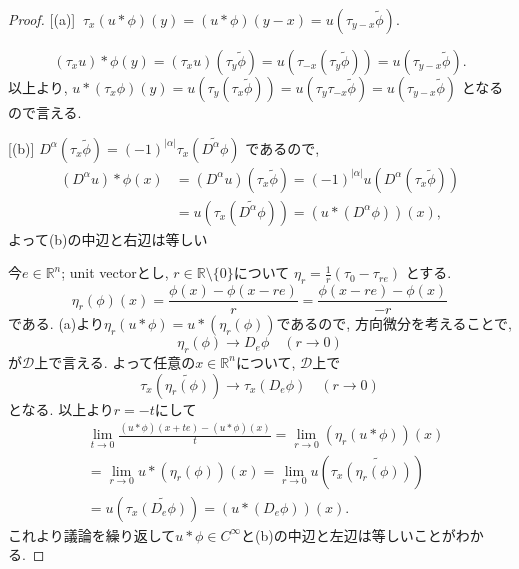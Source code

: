 \documentclass[dvipdfmx,a4paper,11pt]{article} %
\theoremstyle{definition}
\theoremstyle{remark}
\numberwithin{equation}{section}
\begin{document}
\begin{proof}

[(a)] \(\ \tau_x(u \ast \phi)(y) = (u \ast \phi)(y-x) = u(\tau_{y-x} \widetilde{\phi})\).

\[
(\tau_x u) \ast \phi (y) = (\tau_x u)(\tau_y \widetilde{\phi}) = u(\tau_{-x}(\tau_y \widetilde{\phi})) 
= u(\tau_{y-x} \widetilde{\phi}).
\]
以上より, \(u \ast (\tau_x \phi)(y) = u(\tau_y (\tau_x \widetilde{\phi})) = u(\tau_y \tau_{-x} \widetilde{\phi}) = u(\tau_{y-x} \widetilde{\phi})\)  となるので言える. 

[(b)]
\(D^\alpha (\tau_x \widetilde{\phi}) = (-1)^{|\alpha|} \tau_x (\widetilde{D^\alpha \phi})\) 
であるので, 
\begin{align*}
(D^\alpha u) \ast \phi (x) 
&= (D^\alpha u)(\tau_x \widetilde{\phi}) 
= (-1)^{|\alpha|} u(D^\alpha (\tau_x \widetilde{\phi})) \\
&= u(\tau_x (\widetilde{D^\alpha \phi})) = (u \ast (D^\alpha \phi))(x),
\end{align*}
よって(b)の中辺と右辺は等しい

今\(e \in \mathbb{R}^n\); unit vectorとし,  \(r \in \mathbb{R} \setminus \{ 0\}\)について
 $
 \eta_r = \frac{1}{r} (\tau_0 - \tau_{re})
 $
 とする.  %
 \[\eta_r(\phi)(x) = \frac{\phi(x) - \phi(x-re)}{r}
 = \frac{\phi(x - re) - \phi(x)}{-r}
 \]
である.
(a)より\(\eta_r(u \ast \phi) = u \ast (\eta_r(\phi)) \)であるので, 
方向微分を考えることで, 
\[\eta_r(\phi) \to D_e \phi \quad (r \to 0)\]
が\(\mathcal{D}\)上で言える. 
よって任意の\(x \in \mathbb{R}^n\)について, \(\mathcal{D}\)上で
\[ \tau_x (\widetilde{\eta_r(\phi)}) \to \tau_x (D_e \phi) \quad (r \to 0) \]
となる. 
以上より$r=-t$にして
\begin{align*}
 &\lim_{t \to 0} \frac{(u \ast \phi)(x+te) - (u \ast \phi)(x)}{t}
= \lim_{r \to 0} (\eta_{r}(u \ast \phi))(x)\\
&= \lim_{r \to 0} u \ast (\eta_r(\phi))(x) 
= \lim_{r \to 0} u(\tau_x \widetilde{(\eta_r(\phi))}) \\
&= u(\tau_x \widetilde{(D_e \phi)})
= (u \ast (D_e \phi))(x).
\end{align*}
これより議論を繰り返して\(u \ast \phi \in C^\infty\)と(b)の中辺と左辺は等しいことがわかる.


\end{proof}
\end{document}
